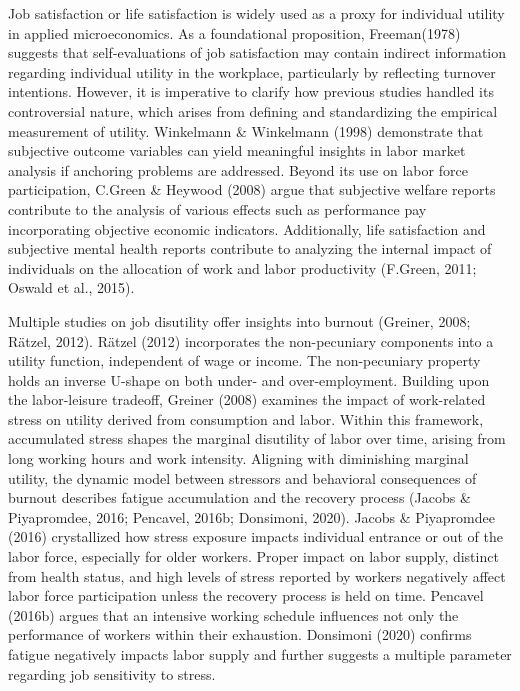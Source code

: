 \documentclass[
  12pt,
]{article}
\begin{document}
Job satisfaction or life satisfaction is widely used as a proxy for
individual utility in applied microeconomics. As a foundational
proposition, Freeman(1978) suggests that self-evaluations of job
satisfaction may contain indirect information regarding individual
utility in the workplace, particularly by reflecting turnover
intentions. However, it is imperative to clarify how previous studies
handled its controversial nature, which arises from defining and
standardizing the empirical measurement of utility. Winkelmann \&
Winkelmann (1998) demonstrate that subjective outcome variables can
yield meaningful insights in labor market analysis if anchoring problems
are addressed. Beyond its use on labor force participation, C.Green \&
Heywood (2008) argue that subjective welfare reports contribute to the
analysis of various effects such as performance pay incorporating
objective economic indicators. Additionally, life satisfaction and
subjective mental health reports contribute to analyzing the internal
impact of individuals on the allocation of work and labor productivity
(F.Green, 2011; Oswald et al., 2015).

Multiple studies on job disutility offer insights into burnout (Greiner,
2008; Rätzel, 2012). Rätzel (2012) incorporates the non-pecuniary
components into a utility function, independent of wage or income. The
non-pecuniary property holds an inverse U-shape on both under- and
over-employment. Building upon the labor-leisure tradeoff, Greiner
(2008) examines the impact of work-related stress on utility derived
from consumption and labor. Within this framework, accumulated stress
shapes the marginal disutility of labor over time, arising from long
working hours and work intensity. Aligning with diminishing marginal
utility, the dynamic model between stressors and behavioral consequences
of burnout describes fatigue accumulation and the recovery process
(Jacobs \& Piyapromdee, 2016; Pencavel, 2016b; Donsimoni, 2020). Jacobs
\& Piyapromdee (2016) crystallized how stress exposure impacts
individual entrance or out of the labor force, especially for older
workers. Proper impact on labor supply, distinct from health status, and
high levels of stress reported by workers negatively affect labor force
participation unless the recovery process is held on time. Pencavel
(2016b) argues that an intensive working schedule influences not only
the performance of workers within their exhaustion. Donsimoni (2020)
confirms fatigue negatively impacts labor supply and further suggests a
multiple parameter regarding job sensitivity to stress.
\end{document}
